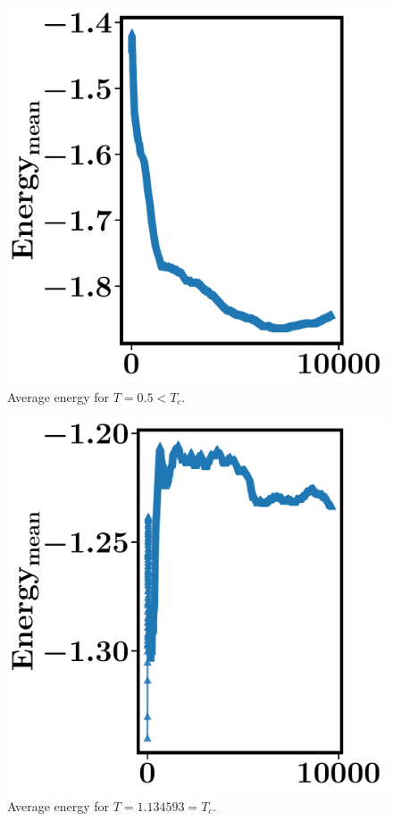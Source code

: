 \documentclass[12pt,letterpaper]{article}
\begin{document}
\begin{figure}[ht]
  \centering
    \includegraphics[width=\textwidth]{figures/plot_energy_T0-5.pdf}
    \caption{Average energy for $T = 0.5 < T_c$.}
     \label{fig:E0.5}
\end{figure}


\begin{figure}[ht]
  \centering
    \includegraphics[width=\textwidth]{figures/plot_energy_T1-134593.pdf}
    \caption{Average energy for $T = 1.134593 = T_c$.}
     \label{fig:E0.5}
\end{figure}
\end{document}

